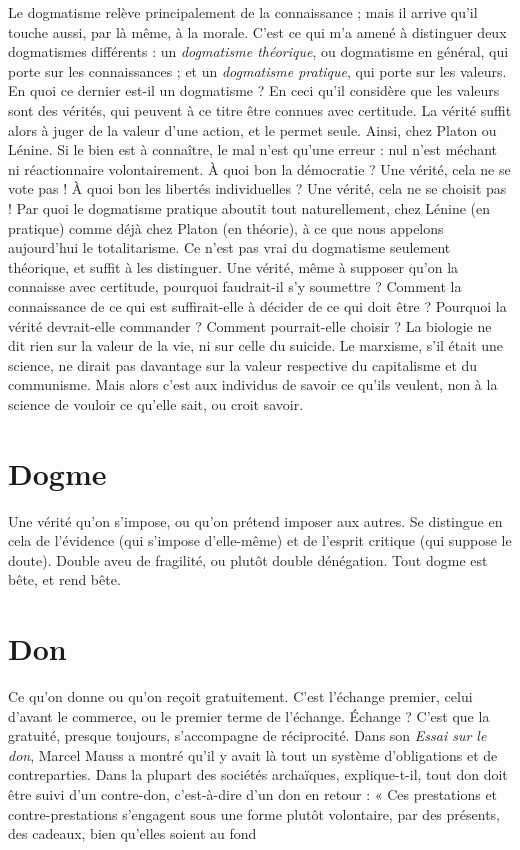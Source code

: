 Le dogmatisme relève principalement de la connaissance ; mais il arrive
qu'il touche aussi, par là même, à la morale. C’est ce qui m’a amené à distinguer
deux dogmatismes différents : un {\it dogmatisme théorique}, ou dogmatisme
en général, qui porte sur les connaissances ; et un {\it dogmatisme pratique}, qui
porte sur les valeurs. En quoi ce dernier est-il un dogmatisme ? En ceci qu’il
considère que les valeurs sont des vérités, qui peuvent à ce titre être connues
avec certitude. La vérité suffit alors à juger de la valeur d’une action, et le
permet seule. Ainsi, chez Platon ou Lénine. Si le bien est à connaître, le mal
n’est qu’une erreur : nul n’est méchant ni réactionnaire volontairement. À quoi
bon la démocratie ? Une vérité, cela ne se vote pas ! À quoi bon les libertés
individuelles ? Une vérité, cela ne se choisit pas ! Par quoi le dogmatisme pratique
aboutit tout naturellement, chez Lénine (en pratique) comme déjà chez
Platon (en théorie), à ce que nous appelons aujourd’hui le totalitarisme. Ce
n'est pas vrai du dogmatisme seulement théorique, et suffit à les distinguer.
Une vérité, même à supposer qu’on la connaisse avec certitude, pourquoi faudrait-il
s’y soumettre ? Comment la connaissance de ce qui est suffirait-elle à
décider de ce qui doit être ? Pourquoi la vérité devrait-elle commander ? Comment
pourrait-elle choisir ? La biologie ne dit rien sur la valeur de la vie, ni sur
celle du suicide. Le marxisme, s’il était une science, ne dirait pas davantage sur
la valeur respective du capitalisme et du communisme. Mais alors c’est aux
individus de savoir ce qu’ils veulent, non à la science de vouloir ce qu’elle sait,
ou croit savoir.

\section{Dogme}
Une vérité qu’on s’impose, ou qu’on prétend imposer aux autres.
Se distingue en cela de l’évidence (qui s'impose d’elle-même) et de
l'esprit critique (qui suppose le doute). Double aveu de fragilité, ou plutôt
double dénégation. Tout dogme est bête, et rend bête.

\section{Don}
Ce qu’on donne ou qu’on reçoit gratuitement. C’est l’échange premier,
celui d’avant le commerce, ou le premier terme de l'échange.
Échange ? C’est que la gratuité, presque toujours, s'accompagne de réciprocité.
Dans son {\it Essai sur le don}, Marcel Mauss a montré qu’il y avait là tout un système
d’obligations et de contreparties. Dans la plupart des sociétés archaïques,
explique-t-il, tout don doit être suivi d’un contre-don, c’est-à-dire d’un don en
retour : « Ces prestations et contre-prestations s’engagent sous une forme
plutôt volontaire, par des présents, des cadeaux, bien qu’elles soient au fond

